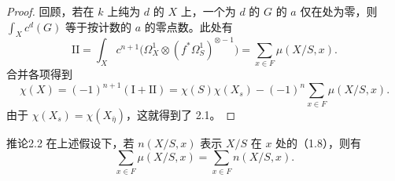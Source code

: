 \begin{proof}
回顾，若在 $k$ 上纯为 $d$ 的 $X$ 上，一个为 $d$ 的 $G$ 的 $a$ 仅在处为零，则 $\int_X c^d(G)$ 等于按计数的 $a$ 的零点数。此处有
\[
\mathrm{II}=\int_X c^{n+1}\bigl(\Omega^1_X\otimes(f^*\Omega^1_S)^{\otimes-1}\bigr)
=\sum_{x\in F}\mu(X/S,x).
\]
合并各项得到
\[
\chi(X)=(-1)^{n+1}(\mathrm I+\mathrm{II})
=\chi(S)\chi(X_s)-(-1)^n\sum_{x\in F}\mu(X/S,x).
\]
由于 $\chi(X_s)=\chi(X_{\bar\eta})$，这就得到了 2.1。
\end{proof}

\begin{SGAresult}{推论}{2.2}
在上述假设下，若 $n(X/S,x)$ 表示 $X/S$ 在 $x$ 处的（1.8），则有
\[
\sum_{x\in F}\mu(X/S,x)=\sum_{x\in F}n(X/S,x).
\]
\end{SGAresult}
